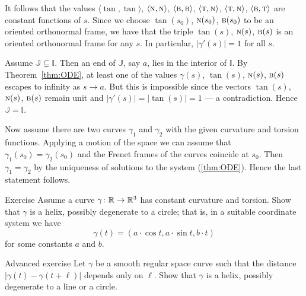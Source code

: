 It follows that the values 
$\langle\tan,\tan\rangle$,
$\langle\text{\sc{n}},\text{\sc{n}}\rangle$,
$\langle\text{\sc{b}},\text{\sc{b}}\rangle$,
$\langle\text{\sc{t}},\text{\sc{n}}\rangle$,
$\langle\text{\sc{t}},\text{\sc{n}}\rangle$,
$\langle\text{\sc{b}},\text{\sc{t}}\rangle$
are constant functions of $s$.
Since we choose $\tan(s_0)$, $\text{\sc{n}}(s_0)$, $\text{\sc{b}}(s_0)$ to be an oriented orthonormal frame, we have that the triple $\tan(s)$, $\text{\sc{n}}(s)$, $\text{\sc{b}}(s)$ is an oriented orthonormal frame for any $s$. In particular, $|\gamma'(s)|=1$ for all $s$.

Assume $\mathbb{J} \varsubsetneq \mathbb{I}$. Then an end of $\mathbb{J}$, say $a$, lies in the interior of $\mathbb{I}$.
By Theorem~\ref{thm:ODE}, at least one of the values $\gamma(s)$, $\tan(s)$, $\text{\sc{n}}(s)$, $\text{\sc{b}}(s)$
escapes to infinity as $s\to a$.
But this is impossible since the vectors $\tan(s)$, $\text{\sc{n}}(s)$, $\text{\sc{b}}(s)$ remain unit and $|\gamma'(s)|=|\tan(s)|=1$ --- a contradiction.
Hence $\mathbb{J}= \mathbb{I}$.

Now assume there are two curves $\gamma_1$ and $\gamma_2$ with the given curvature and torsion functions.
Applying a motion of the space we can assume that $\gamma_1(s_0)=\gamma_2(s_0)$ and the Frenet frames of the curves coincide at $s_0$.
Then $\gamma_1=\gamma_2$ by the uniqueness of  solutions to the system (\ref{thm:ODE}).
Hence the last statement follows.
\qeds

\begin{thm}{Exercise}\label{ex:cur+tor=helix}
Assume a curve $\gamma\colon\mathbb{R}\to\mathbb{R}^3$ has constant curvature and torsion.
Show that $\gamma$ is a helix, possibly degenerate to a circle;
that is, in a suitable coordinate system we have
\[\gamma(t)=(a\cdot \cos t,a\cdot\sin t, b\cdot t)\]
for some constants $a$ and $b$.
\end{thm}


\begin{thm}{Advanced exercise}\label{ex:const-dist}
Let $\gamma$ be a smooth regular space curve such that the distance $|\gamma(t)-\gamma(t+\ell)|$ depends only on $\ell$.
Show that $\gamma$ is a helix, possibly degenerate to a line or a circle.
\end{thm}


